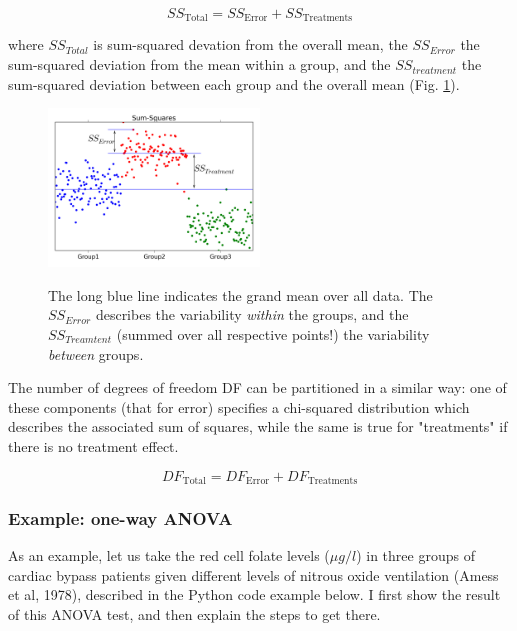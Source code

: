 \begin{equation}
  SS_\text{Total} = SS_\text{Error} + SS_\text{Treatments}
\end{equation}

where $SS_{Total}$ is sum-squared devation from the overall mean, the $SS_{Error}$ the sum-squared deviation from the mean within a group, and the $SS_{treatment}$ the sum-squared deviation between each group and the overall mean (Fig. \ref{fig:ANOVA_annotated}).
\begin{figure}
  \centering
  \includegraphics[width=0.5\textwidth]{../Images/anova_annotated.png}\\
  \caption{The long blue line indicates the grand mean over all data. The $SS_{Error}$ describes the variability \emph{within} the groups, and the $SS_{Treamtent}$ (summed over all respective points!) the variability \emph{between} groups.}\label{fig:ANOVA_annotated}
\end{figure}

The number of degrees of freedom DF can be partitioned in a similar way: one of these components (that for error) specifies a chi-squared distribution which describes the associated sum of squares, while the same is true for "treatments" if there is no treatment effect.

\begin{equation}
  DF_\text{Total} = DF_\text{Error} + DF_\text{Treatments}
\end{equation}


\subsubsection{Example: one-way ANOVA}
As an example, let us take the red cell folate levels ($\mu g/l$) in three groups of cardiac bypass patients given different levels of nitrous oxide ventilation (Amess et al, 1978), described in the Python code example below. I first show the result of this ANOVA test, and then explain the steps to get there.

